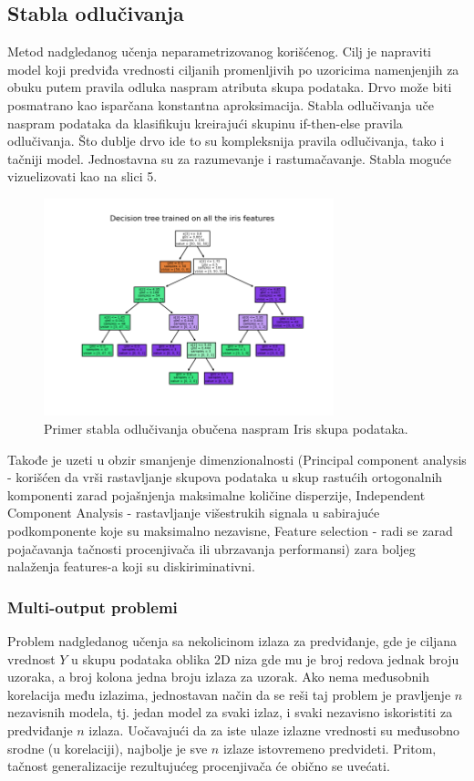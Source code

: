\documentclass[fontsize=12bp, paper=a4]{scrarticle}
\begin{document}
\subsection{Stabla odlučivanja\cite{dtrees}}
Metod nadgledanog učenja neparametrizovanog korišćenog. Cilj je napraviti model koji predviđa vrednosti ciljanih promenljivih po uzoricima namenjenjih za obuku putem pravila odluka naspram atributa skupa podataka. Drvo može biti posmatrano kao isparčana konstantna aproksimacija. Stabla odlučivanja uče naspram podataka da klasifikuju kreirajući skupinu if-then-else pravila odlučivanja. Što dublje drvo ide to su kompleksnija pravila odlučivanja, tako i tačniji model. Jednostavna su za razumevanje i rastumačavanje. Stabla moguće vizuelizovati kao na slici 5.
\begin{figure}[h!]
    \centering
    \includegraphics[width=0.75\textwidth]{image-3.png}
    \caption{Primer stabla odlučivanja obučena naspram Iris skupa podataka.}
\end{figure}

Takođe je uzeti u obzir smanjenje dimenzionalnosti (Principal component analysis - korišćen da vrši rastavljanje skupova podataka u skup rastućih ortogonalnih komponenti zarad pojašnjenja maksimalne količine disperzije\cite{pca}, Independent Component Analysis - rastavljanje višestrukih signala u sabirajuće podkomponente koje su maksimalno nezavisne\cite{ica}, Feature selection - radi se zarad pojačavanja tačnosti procenjivača ili ubrzavanja performansi\cite{fs}) zara boljeg nalaženja features-a koji su diskiriminativni.

\subsubsection{Multi-output problemi}
\label{sec:mop}
Problem nadgledanog učenja sa nekolicinom izlaza za predviđanje, gde je ciljana vrednost $Y$ u skupu podataka oblika 2D niza gde mu je broj redova jednak broju uzoraka, a broj kolona jedna broju izlaza za uzorak.
Ako nema međusobnih korelacija među izlazima, jednostavan način da se reši taj problem je pravljenje $n$ nezavisnih modela, tj. jedan model za svaki izlaz, i svaki nezavisno iskoristiti za predviđanje $n$ izlaza. Uočavajući da za iste ulaze izlazne vrednosti su međusobno srodne (u korelaciji), najbolje je sve $n$ izlaze istovremeno predvideti.
Pritom, tačnost generalizacije rezultujućeg procenjivača će obično se uvećati.
\end{document}
